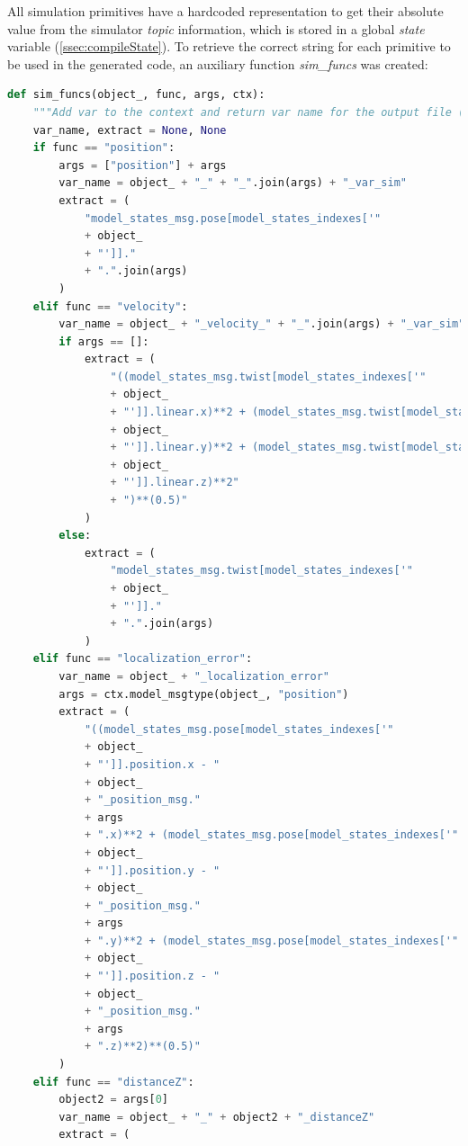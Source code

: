 All simulation primitives have a hardcoded representation to get their absolute value from the simulator \textit{topic} information, which is stored in a global \textit{state} variable (\autoref{ssec:compileState}). To retrieve the correct string for each primitive to be used in the generated code, an auxiliary function \textit{sim\_funcs} was created:

\begin{lstlisting}[language=Python]
    def sim_funcs(object_, func, args, ctx):
    """Add var to the context and return var name for the output file (Considering the function used)"""
    var_name, extract = None, None
    if func == "position":
        args = ["position"] + args
        var_name = object_ + "_" + "_".join(args) + "_var_sim"
        extract = (
            "model_states_msg.pose[model_states_indexes['"
            + object_
            + "']]."
            + ".".join(args)
        )
    elif func == "velocity":
        var_name = object_ + "_velocity_" + "_".join(args) + "_var_sim"
        if args == []:
            extract = (
                "((model_states_msg.twist[model_states_indexes['"
                + object_
                + "']].linear.x)**2 + (model_states_msg.twist[model_states_indexes['"
                + object_
                + "']].linear.y)**2 + (model_states_msg.twist[model_states_indexes['"
                + object_
                + "']].linear.z)**2"
                + ")**(0.5)"
            )
        else:
            extract = (
                "model_states_msg.twist[model_states_indexes['"
                + object_
                + "']]."
                + ".".join(args)
            )
    elif func == "localization_error":
        var_name = object_ + "_localization_error"
        args = ctx.model_msgtype(object_, "position")
        extract = (
            "((model_states_msg.pose[model_states_indexes['"
            + object_
            + "']].position.x - "
            + object_
            + "_position_msg."
            + args
            + ".x)**2 + (model_states_msg.pose[model_states_indexes['"
            + object_
            + "']].position.y - "
            + object_
            + "_position_msg."
            + args
            + ".y)**2 + (model_states_msg.pose[model_states_indexes['"
            + object_
            + "']].position.z - "
            + object_
            + "_position_msg."
            + args
            + ".z)**2)**(0.5)"
        )
    elif func == "distanceZ":
        object2 = args[0]
        var_name = object_ + "_" + object2 + "_distanceZ"
        extract = (

\end{lstlisting}

